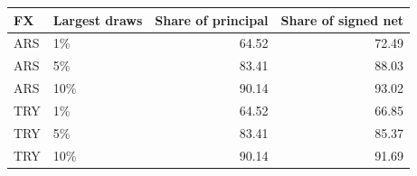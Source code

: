 \begin{tabular}{llrr}
\toprule
FX & Largest draws & Share of principal & Share of signed net \\
\midrule
ARS & 1\% & 64.52 & 72.49 \\
ARS & 5\% & 83.41 & 88.03 \\
ARS & 10\% & 90.14 & 93.02 \\
TRY & 1\% & 64.52 & 66.85 \\
TRY & 5\% & 83.41 & 85.37 \\
TRY & 10\% & 90.14 & 91.69 \\
\bottomrule
\end{tabular}
